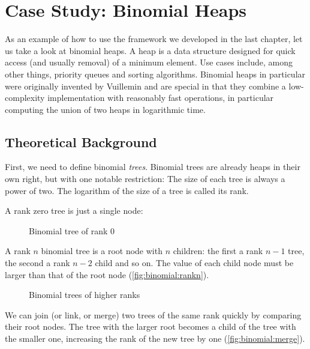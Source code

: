 
\chapter{Case Study: Binomial Heaps}
\label{ch:casestudyamortized}
As an example of how to use the framework we developed in the last chapter, let us take a look at binomial heaps. A heap is a data structure designed for quick access (and usually removal) of a minimum element. Use cases include, among other things, priority queues and sorting algorithms. Binomial heaps in particular were originally invented by Vuillemin \cite{vuillemin:1978:binheaps} and are special in that they combine a low-complexity implementation with reasonably fast operations, in particular computing the union of two heaps in logarithmic time.

\section{Theoretical Background}
First, we need to define binomial \emph{trees}. Binomial trees are already heaps in their own right, but with one notable restriction: The size of each tree is always a power of two. The logarithm of the size of a tree is called its rank.

A rank zero tree is just a single node:

\begin{figure}[h]
\begin{center}
    
\end{center}
\caption{Binomial tree of rank 0}
\label{fig:binomial:rank0}
\end{figure}

A rank $n$ binomial tree is a root node with $n$ children: the first a rank $n-1$ tree, the second a rank $n-2$ child and so on. The value of each child node must be larger than that of the root node (\autoref{fig:binomial:rankn}).

\begin{figure}[h]
\begin{center}
    
\end{center}
\caption{Binomial trees of higher ranks}
\label{fig:binomial:rankn}
\end{figure}

We can join (or link, or merge) two trees of the same rank quickly by comparing their root nodes. The tree with the larger root becomes a child of the tree with the smaller one, increasing the rank of the new tree by one (\autoref{fig:binomial:merge}).

